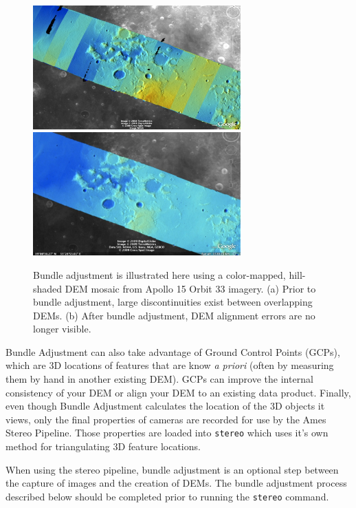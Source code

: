 \begin{figure}[bt]
  \centering
  \includegraphics[width=8cm]{images/ba_orig}
  \includegraphics[width=8cm]{images/ba_adjusted}
  \caption{Bundle adjustment is illustrated here using a color-mapped,
    hill-shaded DEM mosaic from Apollo 15 Orbit 33 imagery. (a) Prior
    to bundle adjustment, large discontinuities exist between
    overlapping DEMs. (b) After bundle adjustment, DEM alignment
    errors are no longer visible.}
  \label{fig:bundle_adjustment}
\end{figure}

Bundle Adjustment can also take advantage of Ground Control Points
(GCPs), which are 3D locations of features that are know {\em a
  priori} (often by measuring them by hand in another existing
DEM). GCPs can improve the internal consistency of your DEM or align
your DEM to an existing data product. Finally, even though Bundle
Adjustment calculates the location of the 3D objects it views, only
the final properties of cameras are recorded for use by the Ames
Stereo Pipeline. Those properties are loaded into \texttt{stereo}
which uses it's own method for triangulating 3D feature locations.

When using the stereo pipeline, bundle adjustment is an optional step
between the capture of images and the creation of DEMs.  The bundle
adjustment process described below should be completed prior to
running the {\tt stereo} command.

\begin{center}
\end{center}


